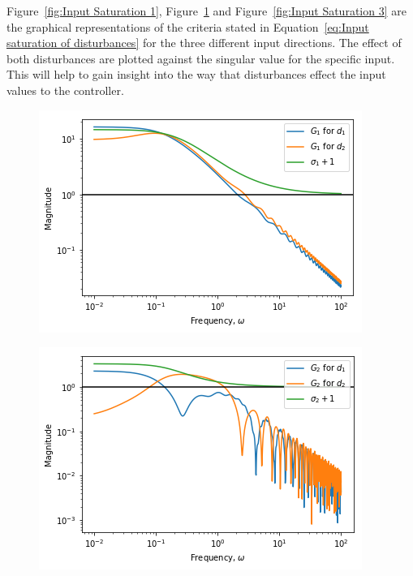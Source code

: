  Figure~\ref{fig:Input Saturation 1}, Figure~\ref{fig:Input Saturation 2} and Figure~\ref{fig:Input Saturation 3} are the graphical representations of the criteria stated in Equation~\ref{eq:Input saturation of disturbances} for the three different input directions. The effect of both disturbances are plotted against the singular value for the specific input. This will help to gain insight into the way that disturbances effect the input values to the controller.
 
 \begin{figure}[H]
 	\centering
 	\begin{minipage}{.48\textwidth}
 		\centering
 		\includegraphics[width=\linewidth]{Figures/InputSaturation1}
 		\label{fig:Input Saturation 1}
 	\end{minipage}%
 	\hfill
 	\begin{minipage}{.48\textwidth}
 		\centering
 		\includegraphics[width=\linewidth]{Figures/InputSaturation2}
 		\label{fig:Input Saturation 2}
 	\end{minipage}
 \end{figure}

